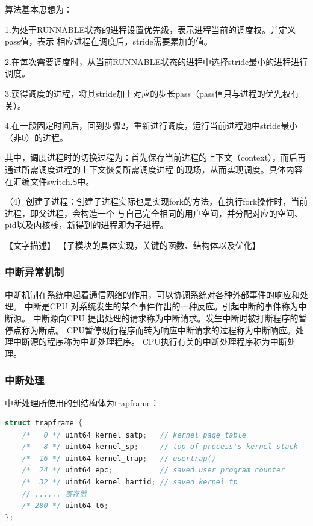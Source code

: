 \documentclass[UTF8,a4paper,10pt]{ctexart}
\begin{document}
算法基本思想为：

1.为处于RUNNABLE状态的进程设置优先级，表示进程当前的调度权。并定义pass值，表示
相应进程在调度后，stride需要累加的值。

2.在每次需要调度时，从当前RUNNABLE状态的进程中选择stride最小的进程进行调度。

3.获得调度的进程，将其stride加上对应的步长pass（pass值只与进程的优先权有关）。

4.在一段固定时间后，回到步骤2，重新进行调度，运行当前进程池中stride最小（非0）的进程。

其中，调度进程时的切换过程为：首先保存当前进程的上下文（context），而后再通过所需调度进程的上下文恢复所需调度进程
的现场，从而实现调度。具体内容在汇编文件switch.S中。

（4）创建子进程：创建子进程实际也是实现fork的方法，在执行fork操作时，当前进程，即父进程，会构造一个
与自己完全相同的用户空间，并分配对应的空间、pid以及内核栈，新得到的进程即为子进程。

【文字描述】
【子模块的具体实现，关键的函数、结构体以及优化】
\subsubsection{中断异常机制}

中断机制在系统中起着通信网络的作用，可以协调系统对各种外部事件的响应和处理。
中断是CPU 对系统发生的某个事件作出的一种反应。引起中断的事件称为中断源。
中断源向CPU 提出处理的请求称为中断请求。发生中断时被打断程序的暂停点称为断点。
CPU暂停现行程序而转为响应中断请求的过程称为中断响应。处理中断源的程序称为中断处理程序。
CPU执行有关的中断处理程序称为中断处理。



\subsubsection{中断处理}

中断处理所使用的到结构体为trapframe：

\begin{lstlisting}[title=trapframe结构体,frame=trbl,language={C}]
  struct trapframe {
    /*   0 */ uint64 kernel_satp;   // kernel page table
    /*   8 */ uint64 kernel_sp;     // top of process's kernel stack
    /*  16 */ uint64 kernel_trap;   // usertrap()
    /*  24 */ uint64 epc;           // saved user program counter
    /*  32 */ uint64 kernel_hartid; // saved kernel tp
    // ...... 寄存器
    /* 280 */ uint64 t6;
};
  \end{lstlisting}
\end{document}
